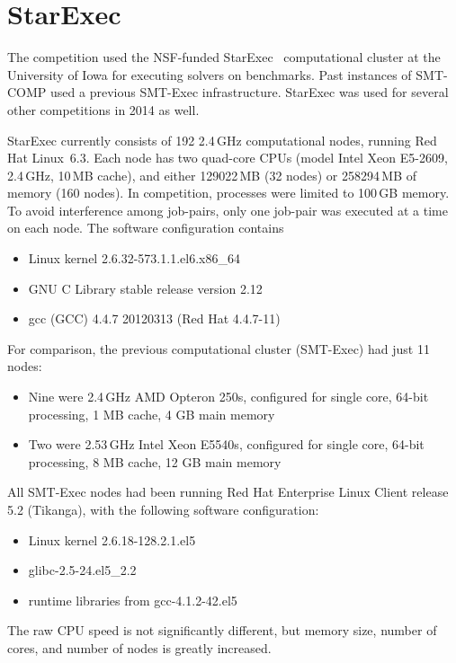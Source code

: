 \documentclass[twoside,11pt]{article}
\begin{document}
\section{StarExec}
\label{sec:starexec}

The competition used the NSF-funded StarExec~\cite{DBLP:conf/cade/StumpST14} computational cluster at the University of Iowa for executing solvers on benchmarks. Past instances of SMT-COMP used a previous SMT-Exec infrastructure. StarExec was used for several other competitions in 2014 as well.

StarExec currently consists of 192 2.4\,GHz computational nodes, running Red Hat Linux~6.3. Each node has two quad-core CPUs (model Intel Xeon E5-2609, 2.4\,GHz, 10\,MB cache), and either 129022\,MB (32 nodes) or 258294\,MB of memory (160 nodes). In competition, processes were limited to 100\,GB memory. To avoid interference among job-pairs, only one job-pair was executed at a time on each node. The software configuration contains
\begin{itemize}[noitemsep,nolistsep]
\item Linux kernel 2.6.32-573.1.1.el6.x86\_64
\item GNU C Library stable release version 2.12
\item gcc (GCC) 4.4.7 20120313 (Red Hat 4.4.7-11)
\end{itemize}

For comparison, the previous computational cluster (SMT-Exec) had just 11 nodes:
\begin{itemize}[noitemsep,nolistsep]
\item Nine were 2.4\,GHz AMD Opteron 250s, configured for single core, 64-bit processing, 1 MB cache, 4 GB main memory
\item Two were 2.53\,GHz Intel Xeon E5540s, configured for single core, 64-bit processing, 8 MB cache, 12 GB main memory
\end{itemize}
All SMT-Exec nodes had been running Red Hat Enterprise Linux Client release 5.2 (Tikanga), with the following software configuration:
\begin{itemize}[noitemsep,nolistsep]
\item Linux kernel 2.6.18-128.2.1.el5
\item glibc-2.5-24.el5\_2.2
\item runtime libraries from gcc-4.1.2-42.el5
\end{itemize}
The raw CPU speed is not significantly different, but memory size, number of cores, and number of nodes is greatly increased.
\end{document}

